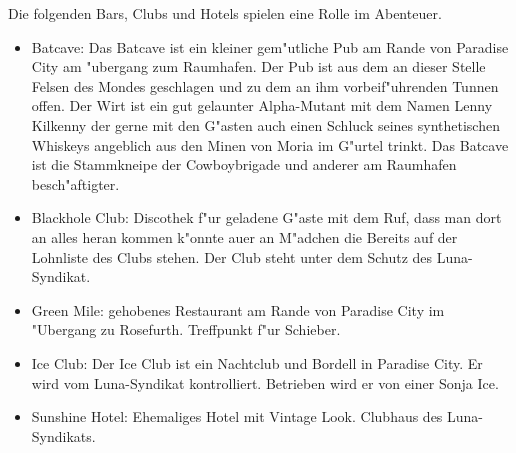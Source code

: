 
Die folgenden Bars, Clubs und Hotels spielen eine Rolle im Abenteuer.

\begin{itemize}
    \item Batcave: Das Batcave ist ein kleiner gem"utliche Pub am Rande von Paradise City am "ubergang zum Raumhafen. Der Pub ist aus dem an dieser Stelle Felsen des Mondes geschlagen und zu dem an ihm vorbeif"uhrenden Tunnen offen. Der Wirt ist ein gut gelaunter Alpha-Mutant mit dem Namen Lenny Kilkenny der gerne mit den G"asten auch einen Schluck seines synthetischen Whiskeys angeblich aus den Minen von Moria im G"urtel trinkt. Das Batcave ist die Stammkneipe der Cowboybrigade und anderer am Raumhafen besch"aftigter.
    \item Blackhole Club: Discothek f"ur geladene G"aste mit dem Ruf, dass man dort an alles heran kommen k"onnte au\3er an M"adchen die Bereits auf der Lohnliste des Clubs stehen. Der Club steht unter dem Schutz des Luna-Syndikat.
    \item Green Mile: gehobenes Restaurant am Rande von Paradise City im "Ubergang zu Rosefurth.  Treffpunkt f"ur Schieber.
    \item Ice Club: Der Ice Club ist ein Nachtclub und Bordell in Paradise City. Er wird vom Luna-Syndikat kontrolliert. Betrieben wird er  
        von einer Sonja Ice.
    \item Sunshine Hotel: Ehemaliges Hotel mit Vintage Look. Clubhaus des Luna-Syndikats.    
\end{itemize}


